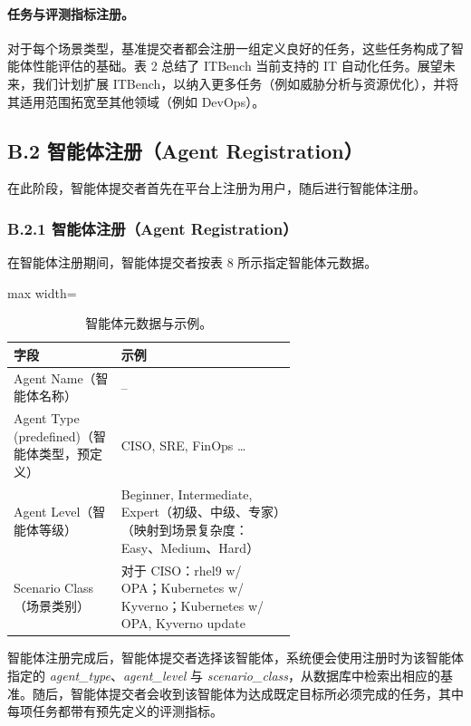 \documentclass[10pt,UTF8,fontset=fandol]{ctexart}
\begin{document}
\paragraph{任务与评测指标注册。}
对于每个场景类型，基准提交者都会注册一组定义良好的任务，这些任务构成了智能体性能评估的基础。表 2 总结了 ITBench 当前支持的 IT 自动化任务。展望未来，我们计划扩展 ITBench，以纳入更多任务（例如威胁分析与资源优化），并将其适用范围拓宽至其他领域（例如 DevOps）。

\subsection{B.2 智能体注册（Agent Registration）}

在此阶段，智能体提交者首先在平台上注册为用户，随后进行智能体注册。

\subsubsection{B.2.1 智能体注册（Agent Registration）}

在智能体注册期间，智能体提交者按表 8 所示指定智能体元数据。

\begin{table}[H]
\centering
\caption{智能体元数据与示例。}
\label{tab:8}
\begin{adjustbox}{max width=\linewidth}
\begin{tabular}{@{}lp{0.62\linewidth}@{}}
\toprule
\textbf{字段} & \textbf{示例} \\
\midrule
Agent Name（智能体名称） & -- \\
Agent Type (predefined)（智能体类型，预定义） & CISO, SRE, FinOps \ldots \\
Agent Level（智能体等级） & Beginner, Intermediate, Expert（初级、中级、专家）（映射到场景复杂度：Easy、Medium、Hard） \\
Scenario Class（场景类别） & 对于 CISO：rhel9 w/ OPA；Kubernetes w/ Kyverno；Kubernetes w/ OPA, Kyverno update \\
\bottomrule
\end{tabular}
\end{adjustbox}
\end{table}

智能体注册完成后，智能体提交者选择该智能体，系统便会使用注册时为该智能体指定的 \textit{agent\_type}、\textit{agent\_level} 与 \textit{scenario\_class}，从数据库中检索出相应的基准。随后，智能体提交者会收到该智能体为达成既定目标所必须完成的任务，其中每项任务都带有预先定义的评测指标。
\end{document}
